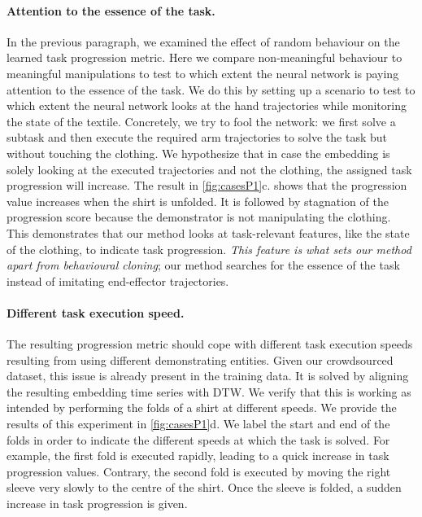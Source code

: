 \documentclass[\home/main.tex]{subfiles}
\begin{document}
\paragraph{Attention to the essence of the task.}
In the previous paragraph, we examined the effect of random behaviour on the learned task progression metric. Here we compare non-meaningful behaviour to meaningful manipulations to test to which extent the neural network is paying attention to the essence of the task. We do this by setting up a scenario to test to which extent the neural network looks at the hand trajectories while monitoring the state of the textile. Concretely, we try to fool the network: we first solve a subtask and then execute the required arm trajectories to solve the task but without touching the clothing. We hypothesize that in case the embedding is solely looking at the executed trajectories and not the clothing, the assigned task progression will increase. The result in \cref{fig:casesP1}c. shows that the progression value increases when the shirt is unfolded. It is followed by stagnation of the progression score because the demonstrator is not manipulating the clothing. This demonstrates that our method looks at task-relevant features, like the state of the clothing, to indicate task progression. \emph{This feature is what sets our method apart from behavioural cloning}; our method searches for the essence of the task instead of imitating end-effector trajectories.

\paragraph{Different task execution speed.}
The resulting progression metric should cope with different task execution speeds resulting from using different demonstrating entities. Given our crowdsourced dataset, this issue is already present in the training data. It is solved by aligning the resulting embedding time series with DTW. We verify that this is working as intended by performing the folds of a shirt at different speeds. We provide the results of this experiment in \cref{fig:casesP1}d. We label the start and end of the folds in order to indicate the different speeds at which the task is solved. For example, the first fold is executed rapidly, leading to a quick increase in task progression values. Contrary, the second fold is executed by moving the right sleeve very slowly to the centre of the shirt. Once the sleeve is folded, a sudden increase in task progression is given.
\end{document}
